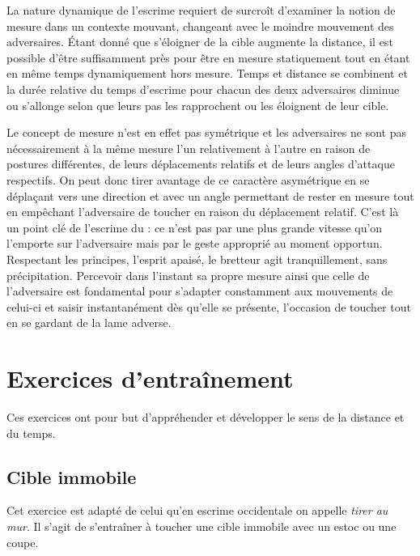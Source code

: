 La nature dynamique de l'escrime requiert de surcroît d'examiner la notion de mesure dans un contexte mouvant, changeant avec le moindre mouvement des adversaires.
Étant donné que s'éloigner de la cible augmente la distance, il est possible d'être suffisamment près pour être en mesure statiquement tout en étant en même temps dynamiquement hors mesure.  
Temps et distance se combinent et la durée relative du temps d'escrime pour chacun des deux adversaires diminue ou s'allonge selon que leurs pas les rapprochent ou les éloignent de leur cible.
%

Le concept de mesure n'est en effet pas symétrique et les adversaires ne sont pas nécessairement à la même mesure l'un relativement à l'autre en raison de postures différentes, de leurs déplacements relatifs et de leurs angles d'attaque respectifs. 
\FloatBarrier
On peut donc tirer avantage de ce caractère asymétrique en se déplaçant vers une direction et avec un angle permettant de rester en mesure tout en empêchant l'adversaire de toucher en raison du déplacement relatif.
C'est là un point clé de l'escrime du \Taiji{} : ce n'est pas par une plus grande vitesse qu'on l'emporte sur l'adversaire mais par le geste approprié au moment opportun.
Respectant les principes, l'esprit apaisé, le bretteur agit tranquillement, sans précipitation.
Percevoir dans l'instant sa propre mesure ainsi que celle de l'adversaire est fondamental pour s'adapter constamment aux mouvements de celui-ci et saisir instantanément dès qu'elle se présente, l'occasion de toucher tout en se gardant de la lame adverse.

\section{Exercices d'entraînement}
Ces exercices ont pour but d'appréhender et développer le sens de la distance et du temps.

\subsection{Cible immobile}
Cet exercice est adapté de celui qu'en escrime occidentale on appelle \emph{tirer au mur}.
Il s'agit de s'entraîner à toucher une cible immobile avec un estoc ou une coupe.

